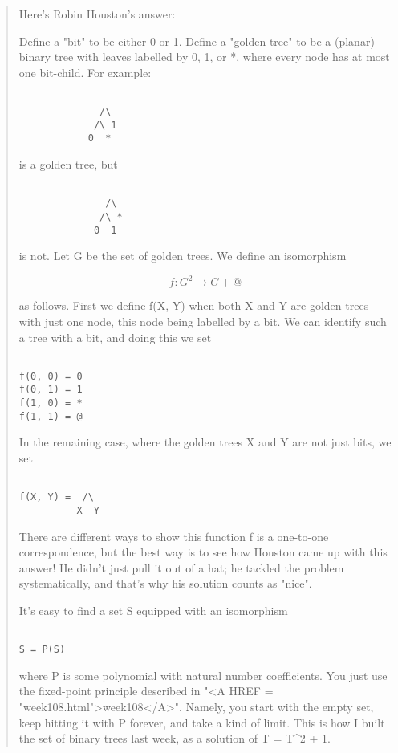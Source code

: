 \begin{quote}
Here's Robin Houston's answer:

Define a "bit" to be either 0 or 1.  Define a "golden tree" to be a 
(planar) binary tree with leaves labelled by 0, 1, or *, where every 
node has at most one bit-child.  For example:


\begin{verbatim}

              /\   
             /\ 1 
            0  * 
\end{verbatim}
    
is a golden tree, but

\begin{verbatim}

               /\   
              /\ *
             0  1
\end{verbatim}
    
is not.
Let G be the set of golden trees.  We define an isomorphism 


$$

f: G^{2} \to  G + {@} 
$$
    
as follows.  First we define f(X, Y) when both X and Y are golden
trees with just one node, this node being labelled by a bit.  We 
can identify such a tree with a bit, and doing this we set


\begin{verbatim}

f(0, 0) = 0
f(0, 1) = 1
f(1, 0) = *
f(1, 1) = @
\end{verbatim}
    
In the remaining case, where the golden trees X and Y are not just bits,
we set


\begin{verbatim}

f(X, Y) =  /\ 
          X  Y
\end{verbatim}
    
There are different ways to show this function f is a one-to-one correspondence,
but the best way is to see how Houston came up with this answer!  He 
didn't just pull it out of a hat; he tackled the problem 
systematically, and that's
why his solution counts as "nice".

It's easy to find a set S equipped with an isomorphism


\begin{verbatim}

S = P(S)
\end{verbatim}
    
where P is some polynomial with natural number coefficients.  You
just use the fixed-point principle described in "<A HREF = "week108.html">week108</A>".  Namely, 
you start with the empty set, keep hitting it with P forever, and take 
a kind of limit.  This is how I built the set of binary trees last week, 
as a solution of T = T^{2} + 1.   


\end{quote}
